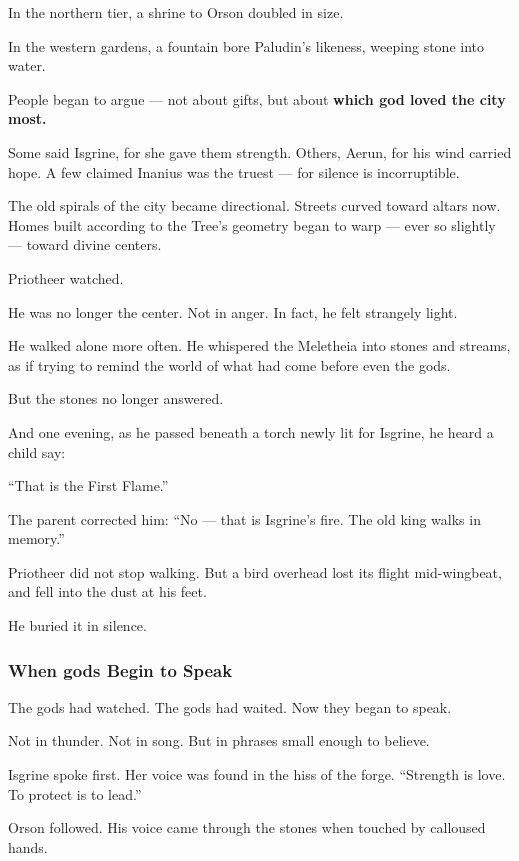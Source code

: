 \documentclass[12pt]{article}
\begin{document}
In the northern tier, a shrine to Orson doubled in size.  

In the western gardens, a fountain bore Paludin’s likeness, weeping stone into water.

People began to argue — not about gifts,  
but about \textbf{which god loved the city most.}

Some said Isgrine, for she gave them strength.  
Others, Aerun, for his wind carried hope.  
A few claimed Inanius was the truest — for silence is incorruptible.

The old spirals of the city became directional.  
Streets curved toward altars now.  
Homes built according to the Tree’s geometry began to warp — ever so slightly — toward divine centers.

Priotheer watched.

He was no longer the center.  
Not in anger.  
In fact, he felt strangely light.

He walked alone more often.  
He whispered the Meletheia into stones and streams,  
as if trying to remind the world of what had come before even the gods.

But the stones no longer answered.

And one evening, as he passed beneath a torch newly lit for Isgrine,  
he heard a child say:

 “That is the First Flame.”

The parent corrected him:  
 “No — that is Isgrine’s fire. The old king walks in memory.”

Priotheer did not stop walking.  
But a bird overhead lost its flight mid-wingbeat,  
and fell into the dust at his feet.

He buried it in silence.

\dotfill

\subsubsection*{When gods Begin to Speak}

The gods had watched.  
The gods had waited.  
Now they began to speak.

Not in thunder. Not in song.  
But in phrases small enough to believe.

Isgrine spoke first.  
Her voice was found in the hiss of the forge.  
 “Strength is love. To protect is to lead.”

Orson followed.  
His voice came through the stones when touched by calloused hands. 
\end{document}
